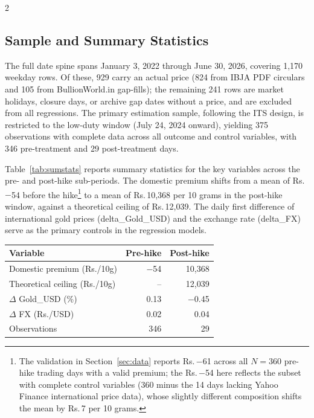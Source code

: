 \documentclass[12pt]{article}
\begin{document}
\begin{multicols}{2}

\subsection*{Sample and Summary Statistics}

The full date spine spans January 3, 2022 through June 30, 2026, covering 1,170 weekday rows. Of these, 929 carry an actual price (824 from IBJA PDF circulars and 105 from BullionWorld.in gap-fills); the remaining 241 rows are market holidays, closure days, or archive gap dates without a price, and are excluded from all regressions. The primary estimation sample, following the ITS design, is restricted to the low-duty window (July 24, 2024 onward), yielding 375 observations with complete data across all outcome and control variables, with 346 pre-treatment and 29 post-treatment days.

Table~\ref{tab:sumstats} reports summary statistics for the key variables across the pre- and post-hike sub-periods. The domestic premium shifts from a mean of Rs.\,$-$54 before the hike\footnote{The validation in Section~\ref{sec:data} reports Rs.\,$-$61 across all $N = 360$ pre-hike trading days with a valid premium; the Rs.\,$-$54 here reflects the subset with complete control variables (360 minus the 14 days lacking Yahoo Finance international price data), whose slightly different composition shifts the mean by Rs.\,7 per 10 grams.} to a mean of Rs.\,10,368 per 10 grams in the post-hike window, against a theoretical ceiling of Rs.\,12,039. The daily first difference of international gold prices (delta\_Gold\_USD) and the exchange rate (delta\_FX) serve as the primary controls in the regression models.

\end{multicols}
\vspace{0.5em}
\begin{center}
\begin{minipage}{\linewidth}
\centering
{}
\label{tab:sumstats}
\small
\begin{tabular}{lrr}
\toprule
Variable & Pre-hike & Post-hike \\
\midrule
Domestic premium (Rs./10g) & $-$54 & 10,368 \\
Theoretical ceiling (Rs./10g) & -- & 12,039 \\
$\Delta$ Gold\_USD (\%) & 0.13 & $-$0.45 \\
$\Delta$ FX (Rs./USD) & 0.02 & 0.04 \\
Observations & 346 & 29 \\
\bottomrule
\end{tabular}
\end{minipage}
\end{center}
\end{document}
